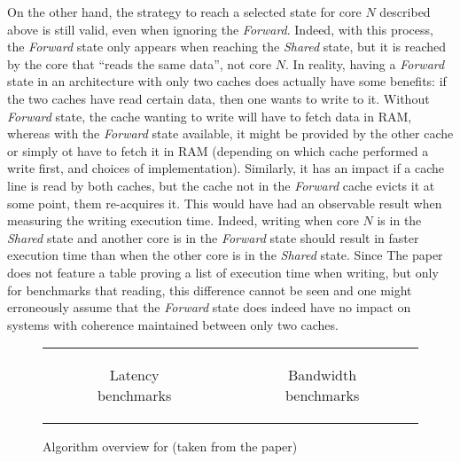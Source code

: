 On the other hand, the strategy to reach a selected state for core $N$ described
above is still valid, even when ignoring the \textit{Forward}. Indeed, with this
process, the \textit{Forward} state only appears when reaching the
\textit{Shared} state, but it is reached by the core that ``reads the same
data'', not core $N$. In reality, having a \textit{Forward} state in an
architecture with only two caches does actually have some benefits: if the two
caches have read certain data, then one wants to write to it. Without
\textit{Forward} state, the cache wanting to write will have to fetch data in
RAM, whereas with the \textit{Forward} state available, it might be provided by
the other cache or simply ot have to fetch it in RAM (depending on which cache
performed a write first, and choices of implementation). Similarly, it has an
impact if a cache line is read by both caches, but the cache not in the
\textit{Forward} cache evicts it at some point, them re-acquires it. This would
have had an observable result when measuring the writing execution time. Indeed,
writing when core $N$ is in the \textit{Shared} state and another core is in the
\textit{Forward} state should result in faster execution time than when the other core
is in the \textit{Shared} state. Since The paper does not feature a table
proving a list of execution time when writing, but only for benchmarks that reading,
this difference cannot be seen and one might erroneously assume that the
\textit{Forward} state does indeed have no impact on systems with coherence
maintained between only two caches.

\iffalse
Considerations are taken to minimize any mechanic interfering with the
benchmarks: transaction look-aside buffers are pre-loaded and accessed memory
elements are not adjacent to avoid any pre-fetching optimization.
\fi

\begin{figure}[hbt!]
\begin{tabular}{cc}
\begin{subfigure}[t]{0.47\textwidth}

\caption{Latency benchmarks}
\label{fig:micro_bench:intel_nehalem_latency_algo}
\end{subfigure}
&
\begin{subfigure}[t]{0.47\textwidth}

\caption{Bandwidth benchmarks}
\label{fig:micro_bench:intel_nehalem_bandwidth_algo}
\end{subfigure}
\end{tabular}
\caption{%
Algorithm overview for \cite{10.1109/PACT.2009.22} (taken from the paper)
}
\label{fig:micro_bench:intel_nehalem_algo}
\end{figure}

